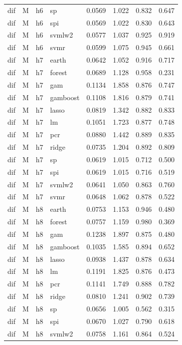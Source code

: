 \begin{ThreePartTable}
\begin{longtable}[t]{llclcccc}
dif & M & h6 & sp & 0.0569 & 1.022 & 0.832 & 0.647\\
dif & M & h6 & spi & 0.0569 & 1.022 & 0.830 & 0.643\\
dif & M & h6 & svmlw2 & 0.0577 & 1.037 & 0.925 & 0.919\\
dif & M & h6 & svmr & 0.0599 & 1.075 & 0.945 & 0.661\\
\addlinespace
dif & M & h7 & earth & 0.0642 & 1.052 & 0.916 & 0.717\\
dif & M & h7 & forest & 0.0689 & 1.128 & 0.958 & 0.231\\
dif & M & h7 & gam & 0.1134 & 1.858 & 0.876 & 0.747\\
dif & M & h7 & gamboost & 0.1108 & 1.816 & 0.879 & 0.741\\
dif & M & h7 & lasso & 0.0819 & 1.342 & 0.882 & 0.833\\
dif & M & h7 & lm & 0.1051 & 1.723 & 0.877 & 0.748\\
dif & M & h7 & pcr & 0.0880 & 1.442 & 0.889 & 0.835\\
dif & M & h7 & ridge & 0.0735 & 1.204 & 0.892 & 0.809\\
dif & M & h7 & sp & 0.0619 & 1.015 & 0.712 & 0.500\\
dif & M & h7 & spi & 0.0619 & 1.015 & 0.716 & 0.519\\
dif & M & h7 & svmlw2 & 0.0641 & 1.050 & 0.863 & 0.760\\
dif & M & h7 & svmr & 0.0648 & 1.062 & 0.878 & 0.522\\
\addlinespace
dif & M & h8 & earth & 0.0753 & 1.153 & 0.946 & 0.480\\
dif & M & h8 & forest & 0.0757 & 1.159 & 0.980 & 0.369\\
dif & M & h8 & gam & 0.1238 & 1.897 & 0.875 & 0.480\\
dif & M & h8 & gamboost & 0.1035 & 1.585 & 0.894 & 0.652\\
dif & M & h8 & lasso & 0.0938 & 1.437 & 0.878 & 0.634\\
dif & M & h8 & lm & 0.1191 & 1.825 & 0.876 & 0.473\\
dif & M & h8 & pcr & 0.1141 & 1.749 & 0.888 & 0.782\\
dif & M & h8 & ridge & 0.0810 & 1.241 & 0.902 & 0.739\\
dif & M & h8 & sp & 0.0656 & 1.005 & 0.562 & 0.315\\
dif & M & h8 & spi & 0.0670 & 1.027 & 0.790 & 0.618\\
dif & M & h8 & svmlw2 & 0.0758 & 1.161 & 0.864 & 0.524\\

\end{longtable}
\end{ThreePartTable}
